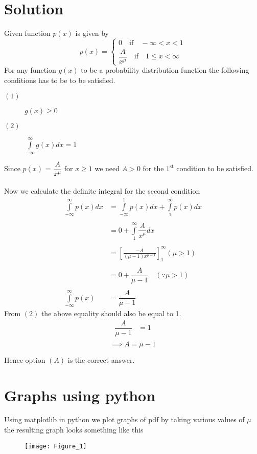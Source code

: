 \documentclass[journal,12pt,twocolumn]{IEEEtran}
\providecommand{\brak}[1]{\ensuremath{\left(#1\right)}}
\begin{document}
\section*{Solution}
Given function $p\brak{x}$ is given by
\begin{equation}
\nonumber p\brak{x}=
\begin{cases}
0 \quad \text{if}\quad -\infty<x<1\\
\dfrac{A}{x^\mu} \quad \text{if} \quad 1\leq x < \infty
\end{cases}
\end{equation}
For any function $g\brak{x}$ to be a probability distribution function the following conditions has to be to be satisfied.\\
\begin{description}
\item[$\brak{1}$] $g\brak{x} \geq 0$\\
\item[$\brak{2}$] $\int\limits_{-\infty}^{\infty}g\brak{x}dx = 1$
\end{description}
Since  $p\brak{x}$ = $\dfrac{A}{x^\mu}$ for $x\geq1$ we need $A>0$ for the $1^\text{st}$ condition to be satisfied.\\\\
Now we calculate the definite integral for the second condition
\begin{align}
\int\limits_{-\infty}^{\infty}p\brak{x}dx &=\int\limits_{-\infty}^{1}p\brak{x}dx + \int\limits_{1}^{\infty}p\brak{x}dx\\\nonumber\\
&= 0 + \int\limits_{1}^{\infty}\dfrac{A}{x^\mu}dx \;\\\nonumber\\
&= \left[\frac{-A}{\brak{\mu-1}x^{\mu-1}}\right]_{1}^{\infty}\brak{ \mu > 1}\\\nonumber\\
&= 0 + \dfrac{A}{\mu-1}  \quad \brak{\because \mu > 1}\\\nonumber\\
\int\limits_{-\infty}^{\infty}p\brak{x} &= \dfrac{A}{\mu-1}
\end{align}
From $\brak{2}$ the above equality should also  be equal to 1. 
\begin{align}
 \dfrac{A}{\mu-1} &=1\\\nonumber
\end{align}
$$\implies A = \mu-1$$

Hence option $\brak{A}$ is the correct answer.
\newpage
\section*{Graphs using python}
Using  matplotlib in python we plot graphs of pdf by taking various values of $\mu$ the resulting graph looks something like this
\begin{figure}[h]
\texttt{[image: Figure\_1]}
\end{figure}
\end{document}
